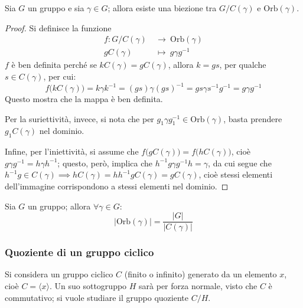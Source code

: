 \documentclass[11pt, a4paper]{scrartcl}
\theoremstyle{definition}
\numberwithin{esempio}{section}
\theoremstyle{definition}
\numberwithin{obs}{section}
\numberwithin{nota}{section}
\numberwithin{equation}{subsection}
\begin{document}
\begin{teorema}
	{}{}
	Sia $G$ un gruppo e sia $\gamma\in G$; allora esiste una biezione tra $G / C(\gamma)$ e $\mathrm{Orb} (\gamma)$.
	\begin{proof}
		Si definisce la funzione
		\[
		\begin{split}
			f:G / C(\gamma) \ &\longrightarrow \ \mathrm{Orb} (\gamma)\\
			gC(\gamma) \ &\longmapsto \ g \gamma g^{-1} 
		\end{split}
		\] 
		$f$ \`e ben definita perch\'e se $kC(\gamma) = g C(\gamma)$, allora $k = gs$, per qualche $s \in C(\gamma)$, per cui:
		\[
		f\big(kC(\gamma)\big) = k \gamma k^{-1} =(gs)\gamma(gs)^{-1} = gs \gamma s^{-1} g^{-1} =g \gamma g^{-1} 
		\] 
		Questo mostra che la mappa \`e ben definita.

		Per la suriettivit\`a, invece, si nota che per $g_1 \gamma g_1^{-1}  \in \mathrm{Orb} (\gamma)$, basta prendere $g_1 C(\gamma)$ nel dominio.

		Infine, per l'iniettivit\`a, si assume che $f\big(g C(\gamma)\big)= f\big(h C(\gamma)\big)$, cio\`e $g \gamma g^{-1} = h \gamma h^{-1} $; questo, per\`o, implica che $h^{-1} g \gamma g^{-1} h = \gamma$, da cui segue che $h^{-1} g \in C(\gamma)\implies hC(\gamma) = h h^{-1} g C(\gamma)=gC(\gamma)$, cio\`e stessi elementi dell'immagine corrispondono a stessi elementi nel dominio.
	\end{proof}
\end{teorema}
\begin{corollario}
	{}{}
	Sia $G$ un gruppo; allora $\forall \gamma \in G$:
	\[
	|\mathrm{Orb} (\gamma)| = \frac{|G|}{|C(\gamma)|}
	\] 
\end{corollario}
\subsubsection{Quoziente di un gruppo ciclico}
Si considera un gruppo ciclico $C$ (finito o infinito) generato da un elemento $x$, cio\`e $C = \langle x \rangle$.
Un suo sottogruppo $H$ sar\`a per forza normale, visto che $C$ \`e commutativo; si vuole studiare il gruppo quoziente $C / H$.
\end{document}
